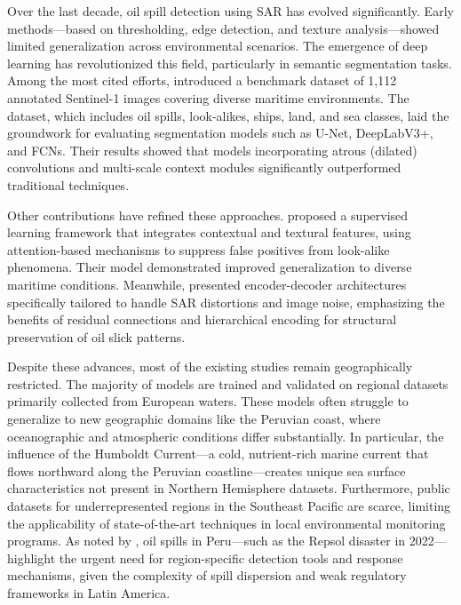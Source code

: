 \documentclass[12pt]{article}
\begin{document}
Over the last decade, oil spill detection using SAR has evolved significantly. Early methods—based on thresholding, edge detection, and texture analysis—showed limited generalization across environmental scenarios. The emergence of deep learning has revolutionized this field, particularly in semantic segmentation tasks. Among the most cited efforts, \cite{krestenitisOilSpillIdentification2019} introduced a benchmark dataset of 1,112 annotated Sentinel-1 images covering diverse maritime environments. The dataset, which includes oil spills, look-alikes, ships, land, and sea classes, laid the groundwork for evaluating segmentation models such as U-Net, DeepLabV3+, and FCNs. Their results showed that models incorporating atrous (dilated) convolutions and multi-scale context modules significantly outperformed traditional techniques.

Other contributions have refined these approaches. \cite{zhuOilSpillContextual2022} proposed a supervised learning framework that integrates contextual and textural features, using attention-based mechanisms to suppress false positives from look-alike phenomena. Their model demonstrated improved generalization to diverse maritime conditions. Meanwhile, \cite{satyanarayanaOilSpillSegmentation2023} presented encoder-decoder architectures specifically tailored to handle SAR distortions and image noise, emphasizing the benefits of residual connections and hierarchical encoding for structural preservation of oil slick patterns.

Despite these advances, most of the existing studies remain geographically restricted. The majority of models are trained and validated on regional datasets primarily collected from European waters. These models often struggle to generalize to new geographic domains like the Peruvian coast, where oceanographic and atmospheric conditions differ substantially. In particular, the influence of the Humboldt Current—a cold, nutrient-rich marine current that flows northward along the Peruvian coastline—creates unique sea surface characteristics not present in Northern Hemisphere datasets. Furthermore, public datasets for underrepresented regions in the Southeast Pacific are scarce, limiting the applicability of state-of-the-art techniques in local environmental monitoring programs. As noted by \cite{mogollonREPSOLOilSpill2023}, oil spills in Peru—such as the Repsol disaster in 2022—highlight the urgent need for region-specific detection tools and response mechanisms, given the complexity of spill dispersion and weak regulatory frameworks in Latin America.
\end{document}
